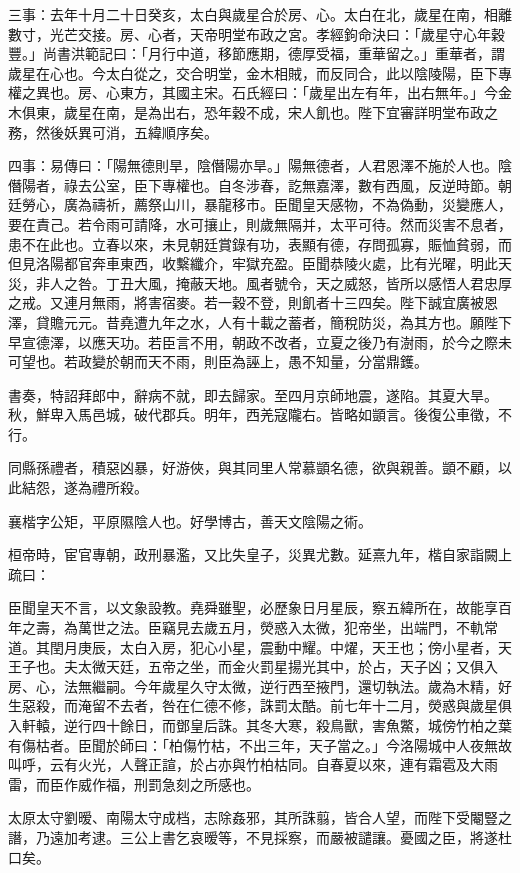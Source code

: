 \begin{pinyinscope}
三事：去年十月二十日癸亥，太白與歲星合於房、心。太白在北，歲星在南，相離數寸，光芒交接。房、心者，天帝明堂布政之宮。孝經鉤命決曰：「歲星守心年穀豐。」尚書洪範記曰：「月行中道，移節應期，德厚受福，重華留之。」重華者，謂歲星在心也。今太白從之，交合明堂，金木相賊，而反同合，此以陰陵陽，臣下專權之異也。房、心東方，其國主宋。石氏經曰：「歲星出左有年，出右無年。」今金木俱東，歲星在南，是為出右，恐年穀不成，宋人飢也。陛下宜審詳明堂布政之務，然後妖異可消，五緯順序矣。

四事：易傳曰：「陽無德則旱，陰僭陽亦旱。」陽無德者，人君恩澤不施於人也。陰僭陽者，祿去公室，臣下專權也。自冬涉春，訖無嘉澤，數有西風，反逆時節。朝廷勞心，廣為禱祈，薦祭山川，暴龍移市。臣聞皇天感物，不為偽動，災變應人，要在責己。若令雨可請降，水可攘止，則歲無隔并，太平可待。然而災害不息者，患不在此也。立春以來，未見朝廷賞錄有功，表顯有德，存問孤寡，賑恤貧弱，而但見洛陽都官奔車東西，收繫纖介，牢獄充盈。臣聞恭陵火處，比有光曜，明此天災，非人之咎。丁丑大風，掩蔽天地。風者號令，天之威怒，皆所以感悟人君忠厚之戒。又連月無雨，將害宿麥。若一穀不登，則飢者十三四矣。陛下誠宜廣被恩澤，貸贍元元。昔堯遭九年之水，人有十載之蓄者，簡稅防災，為其方也。願陛下早宣德澤，以應天功。若臣言不用，朝政不改者，立夏之後乃有澍雨，於今之際未可望也。若政變於朝而天不雨，則臣為誣上，愚不知量，分當鼎鑊。

書奏，特詔拜郎中，辭病不就，即去歸家。至四月京師地震，遂陷。其夏大旱。秋，鮮卑入馬邑城，破代郡兵。明年，西羌寇隴右。皆略如顗言。後復公車徵，不行。

同縣孫禮者，積惡凶暴，好游俠，與其同里人常慕顗名德，欲與親善。顗不顧，以此結怨，遂為禮所殺。

襄楷字公矩，平原隰陰人也。好學博古，善天文陰陽之術。

桓帝時，宦官專朝，政刑暴濫，又比失皇子，災異尤數。延熹九年，楷自家詣闕上疏曰：

臣聞皇天不言，以文象設教。堯舜雖聖，必歷象日月星辰，察五緯所在，故能享百年之壽，為萬世之法。臣竊見去歲五月，熒惑入太微，犯帝坐，出端門，不軌常道。其閏月庚辰，太白入房，犯心小星，震動中耀。中燿，天王也；傍小星者，天王子也。夫太微天廷，五帝之坐，而金火罰星揚光其中，於占，天子凶；又俱入房、心，法無繼嗣。今年歲星久守太微，逆行西至掖門，還切執法。歲為木精，好生惡殺，而淹留不去者，咎在仁德不修，誅罰太酷。前七年十二月，熒惑與歲星俱入軒轅，逆行四十餘日，而鄧皇后誅。其冬大寒，殺鳥獸，害魚鱉，城傍竹柏之葉有傷枯者。臣聞於師曰：「柏傷竹枯，不出三年，天子當之。」今洛陽城中人夜無故叫呼，云有火光，人聲正諠，於占亦與竹柏枯同。自春夏以來，連有霜雹及大雨雷，而臣作威作福，刑罰急刻之所感也。

太原太守劉暧、南陽太守成档，志除姦邪，其所誅翦，皆合人望，而陛下受閹豎之譖，乃遠加考逮。三公上書乞哀暧等，不見採察，而嚴被譴讓。憂國之臣，將遂杜口矣。


\end{pinyinscope}
